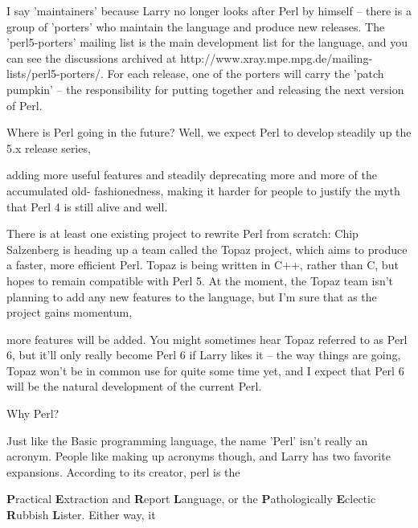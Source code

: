 \documentclass[a4paper,11pt]{book}
\begin{document}
I say 'maintainers' because Larry no longer looks after Perl by himself -- there is a group of 'porters' who maintain the language and produce new releases. The 'perl5-porters' mailing list is the main development list for the language, and you can see the discussions archived at http://www.xray.mpe.mpg.de/mailing-lists/perl5-porters/. For each release, one of the porters will carry the 'patch pumpkin' -- the responsibility for putting together and releasing the next version of Perl.

\noindent  

\noindent  

\noindent  

\noindent  

\noindent 

\noindent 

\noindent Where is Perl going in the future? Well, we expect Perl to develop steadily up the 5.x release series,

\noindent adding more useful features and steadily deprecating more and more of the accumulated old- fashionedness, making it harder for people to justify the myth that Perl 4 is still alive and well.

\noindent 

\noindent There is at least one existing project to rewrite Perl from scratch: Chip Salzenberg is heading up a team called the Topaz project, which aims to produce a faster, more efficient Perl. Topaz is being written in C++, rather than C, but hopes to remain compatible with Perl 5. At the moment, the Topaz team isn't planning to add any new features to the language, but I'm sure that as the project gains momentum,

\noindent more features will be added. You might sometimes hear Topaz referred to as Perl 6, but it'll only really become Perl 6 if Larry likes it -- the way things are going, Topaz won't be in common use for quite some time yet, and I expect that Perl 6 will be the natural development of the current Perl.

\noindent 

\noindent 

\noindent Why Perl?

\noindent 

\noindent Just like the Basic programming language, the name 'Perl' isn't really an acronym. People like making up acronyms though, and Larry has two favorite expansions. According to its creator, perl is the

\noindent \textbf{P}ractical \textbf{E}xtraction and \textbf{R}eport \textbf{L}anguage, or the \textbf{P}athologically \textbf{E}clectic \textbf{R}ubbish \textbf{L}ister. Either way, it
\end{document}
